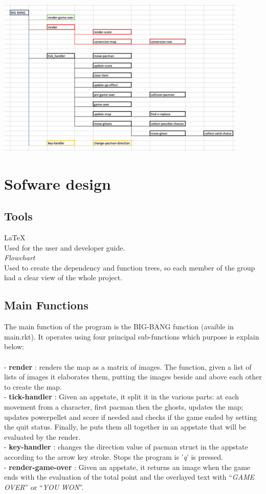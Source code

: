 \documentclass{article}
\begin{document}
\begin{center}
 \includegraphics[width=12cm]{images/dependency_tree2.jpeg}
\end{center}
 
\section{Sofware design}
\subsection{Tools}
\hspace{0.5cm}\LaTeX \\
Used for the user and developer guide.\\
 
\textit{Flowchart}\\
Used to create the dependency and function trees, so each member of the group had a clear view of the whole project.

\subsection{Main Functions}
The main function of the program is the BIG-BANG function (avaible in main.rkt). It operates using four principal sub-functions which purpose is explain below:\\\\
- \textbf{render} : renders the map as a matrix of images. The function, given a list of lists of images it elaborates them, putting the images beside and above each other to create the map.\\
- \textbf{tick-handler} : Given an appstate, it split it in the various parts: at each movement from a character, first pacman then the ghosts, updates the map; updates powerpellet and score if needed and checks if the game ended by setting the quit status. Finally, he puts them all together in an appstate that will be evaluated by the render.\\
- \textbf{key-handler} : changes the direction value of pacman struct in the appstate according to the arrow key stroke. 
Stops the program is '\textit{q}' is pressed.\\
- \textbf{render-game-over} : Given an appstate, it returns an image when the game ends with the evaluation of the total point and the overlayed text with ``\textit{GAME OVER}'' or ``\textit{YOU WON}''.
\end{document}
